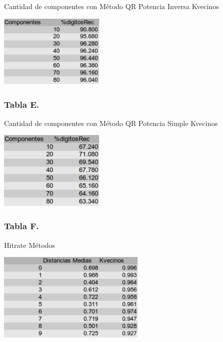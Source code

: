     Cantidad de componentes con M\'etodo QR Potencia Inversa Kvecinos

    \vspace{5mm}
    \centerline{\includegraphics[width=5cm]{img/QrKvecinos.png}}


\subsubsection{Tabla E.}
    
    Cantidad de componentes con M\'etodo QR Potencia Simple Kvecinos

    \vspace{5mm}
    \centerline{\includegraphics[width=5cm]{img/QRDigitosMEdios.png}}

\subsubsection{Tabla F.}
	
	Hitrate M\'etodos

	\vspace{5mm}
	\centerline{\includegraphics[width=7cm]{img/digitosBam_tabla.png}}

